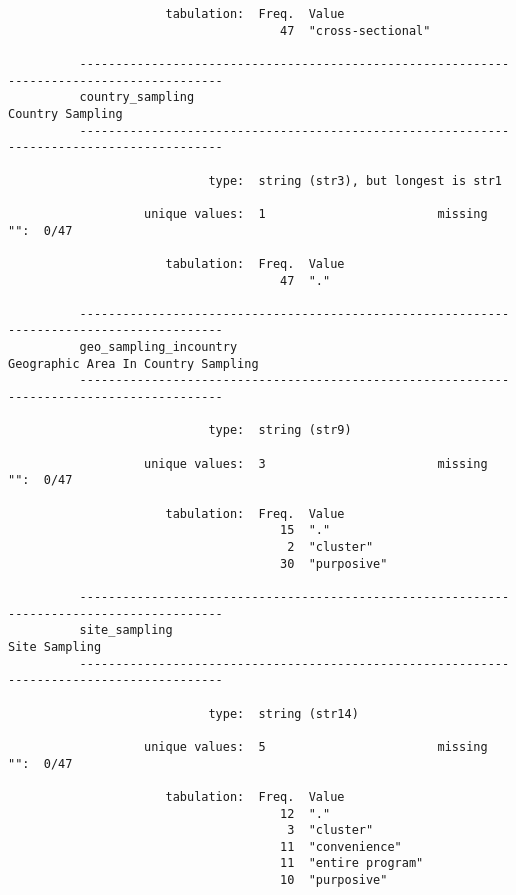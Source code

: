 \documentclass{article}
\begin{document}
\begin{verbatim}
                      tabulation:  Freq.  Value
                                      47  "cross-sectional"
          
          ------------------------------------------------------------------------------------------
          country_sampling                                                          Country Sampling
          ------------------------------------------------------------------------------------------
          
                            type:  string (str3), but longest is str1
          
                   unique values:  1                        missing "":  0/47
          
                      tabulation:  Freq.  Value
                                      47  "."
          
          ------------------------------------------------------------------------------------------
          geo_sampling_incountry                                 Geographic Area In Country Sampling
          ------------------------------------------------------------------------------------------
          
                            type:  string (str9)
          
                   unique values:  3                        missing "":  0/47
          
                      tabulation:  Freq.  Value
                                      15  "."
                                       2  "cluster"
                                      30  "purposive"
          
          ------------------------------------------------------------------------------------------
          site_sampling                                                                Site Sampling
          ------------------------------------------------------------------------------------------
          
                            type:  string (str14)
          
                   unique values:  5                        missing "":  0/47
          
                      tabulation:  Freq.  Value
                                      12  "."
                                       3  "cluster"
                                      11  "convenience"
                                      11  "entire program"
                                      10  "purposive"
          

\end{verbatim}
\end{document}
